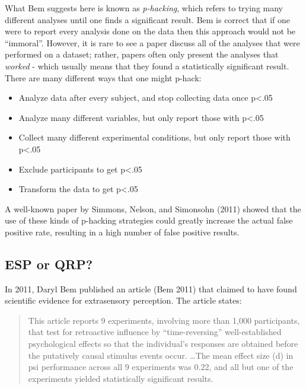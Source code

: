 \documentclass[]{book}
\providecommand{\tightlist}{%
  \setlength{\itemsep}{0pt}\setlength{\parskip}{0pt}}
\theoremstyle{definition}
\theoremstyle{definition}
\theoremstyle{definition}
\theoremstyle{remark}
\begin{document}
What Bem suggests here is known as \emph{p-hacking}, which refers to
trying many different analyses until one finds a significant result. Bem
is correct that if one were to report every analysis done on the data
then this approach would not be ``immoral''. However, it is rare to see
a paper discuss all of the analyses that were performed on a dataset;
rather, papers often only present the analyses that \emph{worked} -
which usually means that they found a statistically significant result.
There are many different ways that one might p-hack:

\begin{itemize}
\tightlist
\item
  Analyze data after every subject, and stop collecting data once
  p\textless{}.05
\item
  Analyze many different variables, but only report those with
  p\textless{}.05
\item
  Collect many different experimental conditions, but only report those
  with p\textless{}.05
\item
  Exclude participants to get p\textless{}.05
\item
  Transform the data to get p\textless{}.05
\end{itemize}

A well-known paper by Simmons, Nelson, and Simonsohn (2011) showed that
the use of these kinds of p-hacking strategies could greatly increase
the actual false positive rate, resulting in a high number of false
positive results.

\subsection{ESP or QRP?}\label{esp-or-qrp}

In 2011, Daryl Bem published an article (Bem 2011) that claimed to have
found scientific evidence for extrasensory perception. The article
states:

\begin{quote}
This article reports 9 experiments, involving more than 1,000
participants, that test for retroactive influence by ``time-reversing''
well-established psychological effects so that the individual's
responses are obtained before the putatively causal stimulus events
occur. \ldots{}The mean effect size (d) in psi performance across all 9
experiments was 0.22, and all but one of the experiments yielded
statistically significant results.
\end{quote}
\end{document}
